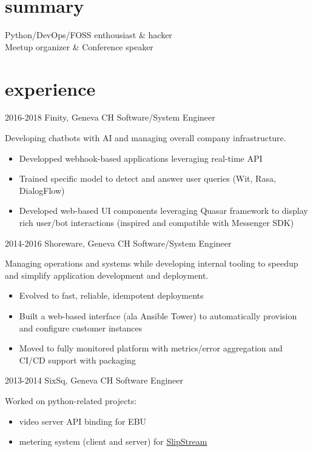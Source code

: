 \documentclass[]{friggeri}
\begin{document}
\section{summary}

Python/DevOps/\ac{FOSS} enthousiast \& hacker\\
Meetup organizer \& Conference speaker

\section{experience}

\begin{entrylist}
  \entry
    {2016-2018}
    {Finity, Geneva CH}
    {Software/System Engineer}
    {Developing chatbots with \ac{AI} and managing overall company infrastructure.
    \begin{itemize}
    \item Developped webhook-based applications leveraging real-time \ac{API}
    \item Trained specific model to detect and answer user queries
        (Wit, Rasa, DialogFlow)
    \item Developed web-based UI components leveraging Quasar framework to display
        rich user/bot interactions (inspired and compatible with
        Messenger \ac{SDK})
    \end{itemize}}
  \entry
    {2014-2016}
    {Shoreware, Geneva CH}
    {Software/System Engineer}
    {Managing operations and systems while developing internal tooling to speedup
     and simplify application development and deployment.
    \begin{itemize}
    \item Evolved to fast, reliable, idempotent deployments
    \item Built a web-based interface (ala Ansible Tower) to automatically
        provision and configure customer instances
    \item Moved to fully monitored platform with metrics/error aggregation
        and CI/CD support with packaging
    \end{itemize}}
  \entry
    {2013-2014}
    {SixSq, Geneva CH}
    {Software Engineer}
    {Worked on python-related projects:
    \begin{itemize}
    \item video server API binding for \ac{EBU}
    \item metering system (client and server) for
    \href{http://sixsq.com/products/slipstream.html}{SlipStream{\texttrademark}}

\end{itemize}}
\end{entrylist}
\end{document}

